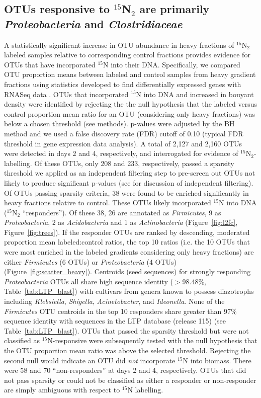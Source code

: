 \subsection{OTUs responsive to $^{15}$N$_{2}$ are primarily \textit{Proteobacteria}
and \textit{Clostridiaceae}}
A statistically significant increase in OTU abundance in heavy fractions of
$^{15}$N$_{2}$ labeled samples relative to corresponding control fractions
provides evidence for OTUs that have incorporated $^{15}$N into their DNA.
Specifically, we compared OTU proportion means between labeled and control
samples from heavy gradient fractions using statistics developed to find
differentially expressed genes with RNASeq data \citep{24699258, Love_2014}.
OTUs that incorporated $^{15}$N into DNA and increased in bouyant density were
identified by rejecting the the null hypothesis that the labeled versus control
proportion mean ratio for an OTU (considering only heavy fractions) was below a
chosen threshold (see methods). p-values were adjusted by the BH method
\citep{citeulike:1042553} and we used a false discovery rate (FDR) cutoff of
0.10 (typical FDR threshold in gene expression data analysis). A total of 2,127
and 2,160 OTUs were detected in days 2 and 4, respectively, and interrogated
for evidence of $^{15}$N$_{2}$-labelling. Of these OTUs, only 208 and 233,
respectively, passed a sparsity threshold we applied as an independent
filtering step to pre-screen out OTUs not likely to produce significant
p-values (see \citet{Love_2014} for discussion of independent filtering). Of
OTUs passing sparsity criteria, 38 were found to be enriched significantly in
heavy fractions relative to control. These OTUs likely incorporated $^{15}$N
into DNA ($^{15}$N$_{2}$ ``responders''). Of these 38, 26 are annotated as
\textit{Firmicutes}, 9 as \textit{Proteobacteria}, 2 as \textit{Acidobacteria}
and 1 as \textit{Actinobacteria} (Figure~\ref{fig:l2fc},
Figure~\ref{fig:trees}). If the responder OTUs are ranked by descending,
moderated proportion mean labeled:control ratios, the top 10 ratios (i.e. the
10 OTUs that were most enriched in the labeled gradients considering only heavy
fractions) are either \textit{Firmicutes} (6 OTUs) or \textit{Proteobacteria}
(4 OTUs) (Figure~\ref{fig:scatter_heavy}). Centroids (seed sequences) for
strongly responding \textit{Proteobacteria} OTUs all share high sequence
identity ($>$98.48\%, Table~\ref{tab:LTP_blast}) with cultivars from genera
known to possess diazotrophs including \textit{Klebsiella}, \textit{Shigella},
\textit{Acinetobacter}, and \textit{Ideonella}. None of the \textit{Firmicutes}
OTU centroids in the top 10 responders share greater than 97\% sequence
identity with sequences in the LTP database (release 115) (see
Table~\ref{tab:LTP_blast}).  OTUs that passed the sparsity threshold but were
not classified as $^{15}$N-responsive were subsequently tested with the null
hypothesis that the OTU proportion mean ratio was above the selected threshold.
Rejecting the second null would indicate an OTU did \textit{not} incorporate
$^{15}$N into biomass. There were 58 and 70 ``non-responders'' at days 2 and 4,
respectively. OTUs that did not pass sparsity or could not be classified as
either a responder or non-responder are simply ambiguous with respect to
$^{15}$N labelling.

